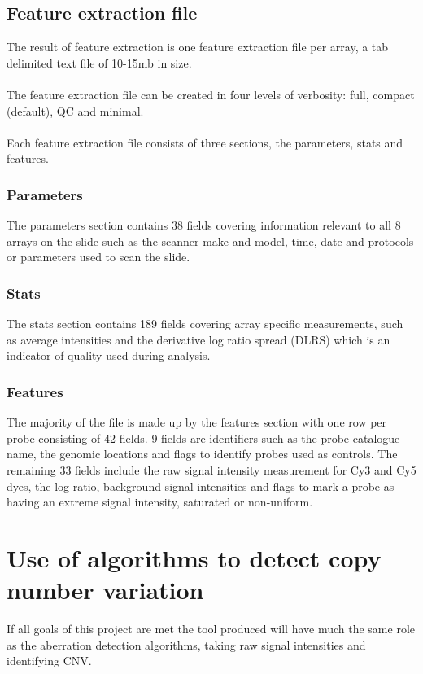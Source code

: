 \subsection{Feature extraction file}
The result of feature extraction is one feature extraction file per array, a tab delimited text file of 10-15mb in size.
\paragraph*{}
The feature extraction file can be created in four levels of  verbosity: full, compact (default), QC and minimal. 
\paragraph*{}
Each feature extraction file consists of three sections, the parameters, stats and features.  

\subsubsection{Parameters}
The parameters section contains 38 fields covering information relevant to all 8 arrays on the slide such as the scanner make and model, time, date and protocols or parameters used to scan the slide. 

\subsubsection{Stats}
The stats section  contains 189 fields covering array specific measurements, such as average intensities and the derivative log ratio spread (DLRS) which is an indicator of quality used during analysis.

\subsubsection{Features}
The majority of the file is made up by the features section with one row per probe consisting of 42 fields. 9 fields are identifiers such as the probe catalogue name, the genomic locations and flags to identify probes used as controls. The remaining 33 fields include the raw signal intensity measurement for Cy3 and Cy5 dyes, the log ratio, background signal intensities and flags to mark a probe as having an extreme signal intensity, saturated or non-uniform.

\section{Use of algorithms to detect copy number variation}
If all goals of this project are met the tool produced will have much the same role as the aberration detection algorithms, taking raw signal intensities and identifying CNV.
